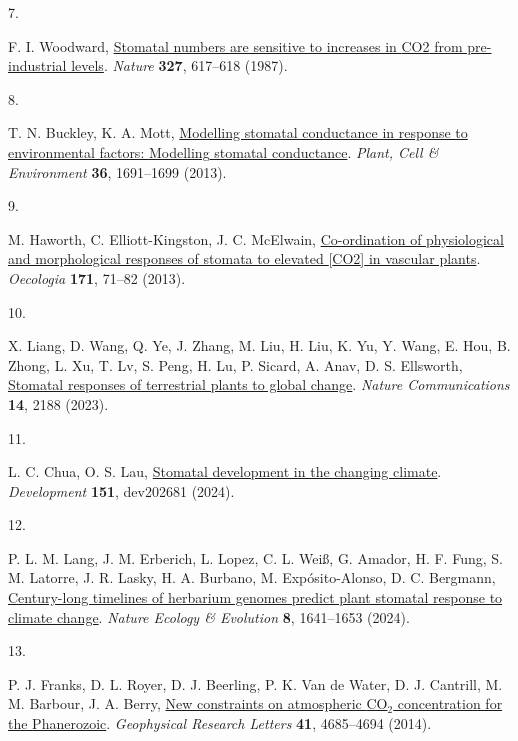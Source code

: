 \documentclass[
  letterpaper,
  DIV=11,
  numbers=noendperiod]{scrartcl}
\newlength{\cslhangindent}
\newlength{\csllabelwidth}
\newenvironment{CSLReferences}[2] %
 {\begin{list}{}{%
  \setlength{\itemindent}{0pt}
  \setlength{\leftmargin}{0pt}
  \setlength{\parsep}{0pt}
  \ifodd #1
   \setlength{\leftmargin}{\cslhangindent}
   \setlength{\itemindent}{-1\cslhangindent}
  \fi
  \setlength{\itemsep}{#2\baselineskip}}}
 {\end{list}}
\newcommand{\CSLLeftMargin}[1]{\parbox[t]{\csllabelwidth}{\strut#1\strut}}
\newcommand{\CSLRightInline}[1]{\parbox[t]{\linewidth - \csllabelwidth}{\strut#1\strut}}
\begin{document}
\begin{CSLReferences}{0}{1}
\CSLLeftMargin{7. }%
\CSLRightInline{F. I. Woodward,
\href{https://doi.org/10.1038/327617a0}{Stomatal numbers are sensitive
to increases in {CO2} from pre-industrial levels}. \emph{Nature}
\textbf{327}, 617--618 (1987).}

\CSLLeftMargin{8. }%
\CSLRightInline{T. N. Buckley, K. A. Mott,
\href{https://doi.org/10.1111/pce.12140}{Modelling stomatal conductance
in response to environmental factors: {Modelling} stomatal conductance}.
\emph{Plant, Cell \& Environment} \textbf{36}, 1691--1699 (2013).}

\CSLLeftMargin{9. }%
\CSLRightInline{M. Haworth, C. Elliott-Kingston, J. C. McElwain,
\href{https://doi.org/10.1007/s00442-012-2406-9}{Co-ordination of
physiological and morphological responses of stomata to elevated
{[}{CO2}{]} in vascular plants}. \emph{Oecologia} \textbf{171}, 71--82
(2013).}

\CSLLeftMargin{10. }%
\CSLRightInline{X. Liang, D. Wang, Q. Ye, J. Zhang, M. Liu, H. Liu, K.
Yu, Y. Wang, E. Hou, B. Zhong, L. Xu, T. Lv, S. Peng, H. Lu, P. Sicard,
A. Anav, D. S. Ellsworth,
\href{https://doi.org/10.1038/s41467-023-37934-7}{Stomatal responses of
terrestrial plants to global change}. \emph{Nature Communications}
\textbf{14}, 2188 (2023).}

\CSLLeftMargin{11. }%
\CSLRightInline{L. C. Chua, O. S. Lau,
\href{https://doi.org/10.1242/dev.202681}{Stomatal development in the
changing climate}. \emph{Development} \textbf{151}, dev202681 (2024).}

\CSLLeftMargin{12. }%
\CSLRightInline{P. L. M. Lang, J. M. Erberich, L. Lopez, C. L. Weiß, G.
Amador, H. F. Fung, S. M. Latorre, J. R. Lasky, H. A. Burbano, M.
Expósito-Alonso, D. C. Bergmann,
\href{https://doi.org/10.1038/s41559-024-02481-x}{Century-long timelines
of herbarium genomes predict plant stomatal response to climate change}.
\emph{Nature Ecology \& Evolution} \textbf{8}, 1641--1653 (2024).}

\CSLLeftMargin{13. }%
\CSLRightInline{P. J. Franks, D. L. Royer, D. J. Beerling, P. K. Van de
Water, D. J. Cantrill, M. M. Barbour, J. A. Berry,
\href{https://doi.org/10.1002/2014GL060457}{New constraints on
atmospheric {CO}\(_{\textrm{2}}\) concentration for the {Phanerozoic}}.
\emph{Geophysical Research Letters} \textbf{41}, 4685--4694 (2014).}


\end{CSLReferences}
\end{document}
